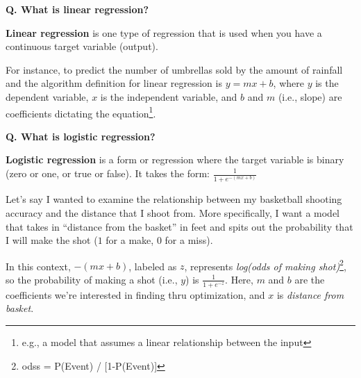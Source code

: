 \begin{frame}[fragile]{\textbf{Q. What is linear regression?}}
  \begin{wideitemize}
  \item \textbf{Linear regression} is one type of regression that is used when
  you have a continuous target variable (output).
  \item For instance, to predict the number of umbrellas sold by the amount of
  rainfall and the algorithm definition for linear regression is $y = mx + b$,
  where $y$ is the dependent variable, $x$ is the independent variable, and $b$
  and $m$ (i.e., slope) are coefficients dictating the equation\footnote{e.g., a
  model that assumes a linear relationship between the input}.
  \end{wideitemize}
\end{frame}

\begin{frame}[fragile]{\textbf{Q. What is logistic regression?}}
  \begin{wideitemize}
  \item \textbf{Logistic regression} is a form or regression where the
  target variable is binary (zero or one, or true or false). It takes the form: {\Large $\frac{1}{1 + e^{-(mx + b)}}$}
  \item Let's say I wanted to examine the relationship between my basketball
  shooting accuracy and the distance that I shoot from. More specifically, I want
  a model that takes in ``distance from the basket'' in feet and spits out the
  probability that I will make the shot ($1$ for a make, $0$ for a miss).
  \begin{wideitemize}\vspace{2mm}\small
    \item In this context, $-(mx + b)$, labeled as $z$, represents
    \textit{log(odds of making shot)}\footnote{odss = P(Event) / [1-P(Event)]},
    so the probability of making a shot (i.e., $y$) is $\frac{1}{1 + e^{-z}}$.
    Here, $m$ and $b$ are the coefficients we're interested in finding thru optimization, and $x$ is \textit{distance from basket}.
  \end{wideitemize}
  \end{wideitemize}
\end{frame}


